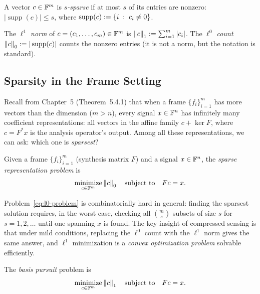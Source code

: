 \begin{definition}
\label{def:sparse}
A vector $c\in\mathbb{F}^m$ is \emph{$s$-sparse} if at most $s$ of its entries
are nonzero: $|\operatorname{supp}(c)| \le s$, where $\operatorname{supp}(c)
:= \left\{ i \;:\; c_i \ne 0 \right\}$.
\end{definition}

\begin{definition}
\label{def:l1-norm}
The \emph{$\ell^1$ norm} of $c = (c_1,\ldots,c_m)\in\mathbb{F}^m$ is
$\left\| c \right\|_1 := \sum_{i=1}^m |c_i|$. The \emph{$\ell^0$ count}
$\left\| c \right\|_0 := |\operatorname{supp}(c)|$ counts the nonzero entries
(it is not a norm, but the notation is standard).
\end{definition}

\subsection{Sparsity in the Frame Setting}
\label{subsec:sparsity-in-frames}

Recall from Chapter~5 (Theorem~5.4.1) that when a frame
$\{f_i\}_{i=1}^m$ has more vectors than the dimension ($m>n$),
every signal $x\in\mathbb{F}^n$ has infinitely many coefficient representations:
all vectors in the affine family $c + \ker F$, where $c = F^*x$ is
the analysis operator's output. Among all these representations, we
can ask: which one is \emph{sparsest}?

\begin{definition}
\label{def:sparse-rep}
Given a frame $\{f_i\}_{i=1}^m$ (synthesis matrix $F$) and a signal
$x\in\mathbb{F}^n$, the \emph{sparse representation problem} is
\begin{equation}
\label{eq:l0-problem}
  \operatorname*{minimize}_{c\in\mathbb{F}^m} \left\| c \right\|_0 \quad\text{subject to}\quad Fc = x.
\end{equation}
\end{definition}

Problem~\eqref{eq:l0-problem} is combinatorially hard in general:
finding the sparsest solution requires, in the worst case, checking all
$\binom{m}{s}$ subsets of size $s$ for $s = 1, 2, \ldots$ until one
spanning $x$ is found. The key insight of compressed sensing is that
under mild conditions, replacing the $\ell^0$ count with the $\ell^1$
norm gives the same answer, and $\ell^1$ minimization is a
\emph{convex optimization problem} solvable efficiently.

\begin{definition}
\label{def:basis-pursuit}
The \emph{basis pursuit} problem is
\begin{equation}
\label{eq:basis-pursuit}
  \operatorname*{minimize}_{c\in\mathbb{F}^m} \left\| c \right\|_1 \quad\text{subject to}\quad Fc = x.
\end{equation}
\end{definition}

